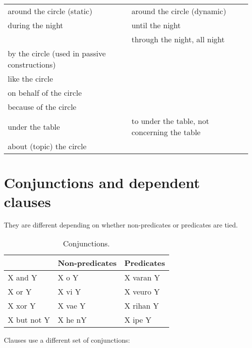 \documentclass{book}
\begin{document}
\begin{longtabu}[c]{|X|X|}
     around the circle (static) &  around the circle (dynamic) \\
     during the night &  until the night \\
    &  through the night, all night \\
     by the circle (used in passive constructions) & \\
     like the circle & \\
     on behalf of the circle & \\
     because of the circle & \\
     under the table &  to under the table, not concerning the table \\
     about (topic) the circle & \\
\end{longtabu}

\chapter{Conjunctions and dependent clauses}

They are different depending on whether non-predicates or predicates are tied.

\begin{table}[h]
    \caption{Conjunctions.}
    \centering
    \begin{tabular}{|l|l|l|}
        \hline
        & Non-predicates & Predicates \\
        \hline
        X and Y & X o Y & X varan Y \\
        X or Y & X vi Y & X veuro Y \\
        X xor Y & X vae Y & X rihan Y \\
        X but not Y & X he nY & X ipe Y \\
        \hline
    \end{tabular}
\end{table}

Clauses use a different set of conjunctions:
\end{document}
